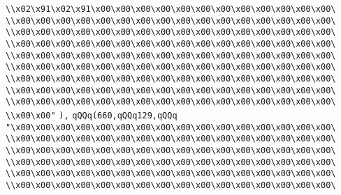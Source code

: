 \verb|\\x02\x91\x02\x91\x00\x00\x00\x00\x00\x00\x00\x00\x00\x00\x00\x00\|\newline
\verb|\\x00\x00\x00\x00\x00\x00\x00\x00\x00\x00\x00\x00\x00\x00\x00\x00\|\newline
\verb|\\x00\x00\x00\x00\x00\x00\x00\x00\x00\x00\x00\x00\x00\x00\x00\x00\|\newline
\verb|\\x00\x00\x00\x00\x00\x00\x00\x00\x00\x00\x00\x00\x00\x00\x00\x00\|\newline
\verb|\\x00\x00\x00\x00\x00\x00\x00\x00\x00\x00\x00\x00\x00\x00\x00\x00\|\newline
\verb|\\x00\x00\x00\x00\x00\x00\x00\x00\x00\x00\x00\x00\x00\x00\x00\x00\|\newline
\verb|\\x00\x00\x00\x00\x00\x00\x00\x00\x00\x00\x00\x00\x00\x00\x00\x00\|\newline
\verb|\\x00\x00\x00\x00\x00\x00\x00\x00\x00\x00\x00\x00\x00\x00\x00\x00\|\newline
\verb|\\x00\x00\x00\x00\x00\x00\x00\x00\x00\x00\x00\x00\x00\x00\x00\x00\|\newline
\verb|\\x00\x00"|\newline
\verb|),|\newline
\verb|qQQq(660,qQQq129,qQQq|\newline
\verb|"\x00\x00\x00\x00\x00\x00\x00\x00\x00\x00\x00\x00\x00\x00\x00\x00\|\newline
\verb|\\x00\x00\x00\x00\x00\x00\x00\x00\x00\x00\x00\x00\x00\x00\x00\x00\|\newline
\verb|\\x00\x00\x00\x00\x00\x00\x00\x00\x00\x00\x00\x00\x00\x00\x00\x00\|\newline
\verb|\\x00\x00\x00\x00\x00\x00\x00\x00\x00\x00\x00\x00\x00\x00\x00\x00\|\newline
\verb|\\x00\x00\x00\x00\x00\x00\x00\x00\x00\x00\x00\x00\x00\x00\x00\x00\|\newline
\verb|\\x00\x00\x00\x00\x00\x00\x00\x00\x00\x00\x00\x00\x00\x00\x00\x00\|\newline
